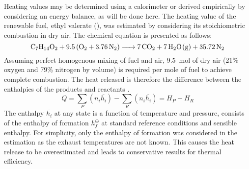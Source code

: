 Heating values may be determined using a calorimeter or derived empirically by considering an energy balance, as will be done here. The heating value of the renewable fuel, ethyl valerate (), was estimated by considering its stoichiometric combustion in dry air. The chemical equation is presented as follows:
\begin{equation}
    \ce{C7H14O2 + 9.5(O2 + 3.76N2) -> 7CO2 + 7H2O(g) + 35.72N2} \label{q3-1}
\end{equation}
Assuming perfect homogenous mixing of fuel and air, \SI{9.5}{\mol} of dry air (21\% oxygen and 79\% nitrogen by volume) is required per mole of fuel to achieve complete combustion. The heat released is therefore the difference between the enthalpies of the products and reactants \cite{q3-r2}.
\begin{equation}
    Q = \sum_P \left(n_i\overline{h_i}\right) - \sum_R \left(n_i\overline{h_i}\right) = H_P - H_R \label{q3-2}
\end{equation}
The enthalpy $\overline{h_i}$ at any state is a function of temperature and pressure, consists of the enthalpy of formation $h_f^{\ominus}$ at standard reference conditions and sensible enthalpy. For simplicity, only the enthalpy of formation was considered in the estimation as the exhaust temperatures are not known. This causes the heat release to be overestimated and leads to conservative results for thermal efficiency.

